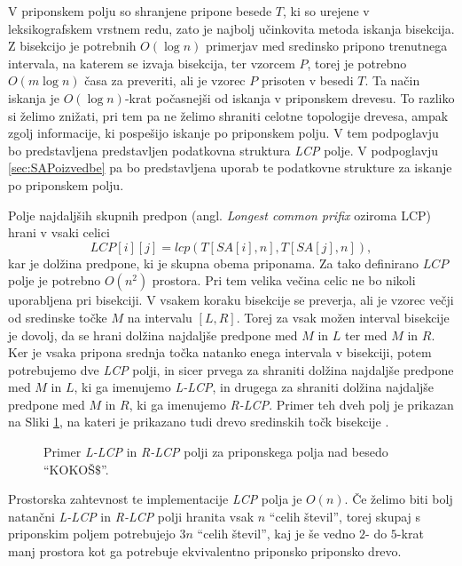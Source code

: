 V priponskem polju so shranjene pripone besede $T$, ki so urejene v leksikografskem vrstnem redu, zato je najbolj učinkovita metoda iskanja bisekcija. Z bisekcijo je potrebnih $O(\log{n})$ primerjav med sredinsko pripono trenutnega intervala, na katerem se izvaja bisekcija, ter vzorcem $P$, torej je potrebno $O(m\log{n})$ časa za preveriti, ali je vzorec $P$ prisoten v besedi $T$. Ta način iskanja je $O(\log{n})$-krat počasnejši od iskanja v priponskem drevesu. To razliko si želimo znižati, pri tem pa ne želimo shraniti celotne topologije drevesa, ampak zgolj informacije, ki pospešijo iskanje po priponskem polju. V tem podpoglavju bo predstavljena predstavljen podatkovna struktura \textit{LCP} polje. V podpoglavju \ref{sec:SAPoizvedbe} pa bo predstavljena uporab te podatkovne strukture za iskanje po priponskem polju.

Polje najdaljših skupnih predpon (angl. \textit{Longest common prifix} oziroma LCP) hrani v vsaki celici 
    $$\textit{LCP}[i][j]=lcp(T[SA[i],n],T[SA[j],n]),$$
kar je dolžina predpone, ki je skupna obema priponama. Za tako definirano $LCP$ polje je potrebno $O(n^2)$ prostora. Pri tem velika večina celic ne bo nikoli uporabljena pri bisekciji. V vsakem koraku bisekcije se preverja, ali je vzorec večji od sredinske točke $M$ na intervalu $[L,R]$. Torej za vsak možen interval bisekcije je dovolj, da se hrani dolžina najdaljše predpone med $M$ in $L$ ter med $M$ in $R$. Ker je vsaka pripona srednja točka natanko enega intervala v bisekciji, potem potrebujemo dve \textit{LCP} polji, in sicer prvega za shraniti dolžina najdaljše predpone med $M$ in $L$, ki ga imenujemo \textit{L-LCP}, in drugega za shraniti dolžina najdaljše predpone med $M$ in $R$, ki ga imenujemo \textit{R-LCP}. Primer teh dveh polj je prikazan na Sliki \ref{fig:RlcpLlcpSuffuxArray}, na kateri je prikazano tudi drevo sredinskih točk bisekcije \cite{Manber1990}. 

\begin{figure}[htb] 
    
    \centering
    \caption{Primer \textit{L-LCP} in \textit{R-LCP} polji za priponskega polja nad besedo \enquote{KOKOŠ$\$$}.} 
    \label{fig:RlcpLlcpSuffuxArray}
\end{figure}

Prostorska zahtevnost te implementacije \textit{LCP} polja je $O(n)$. Če želimo biti bolj natančni \textit{L-LCP} in \textit{R-LCP} polji hranita vsak $n$ \enquote{celih števil}, torej skupaj s priponskim poljem potrebujejo $3n$ \enquote{celih števil}, kaj je še vedno $2$- do $5$-krat manj prostora kot ga potrebuje ekvivalentno priponsko priponsko drevo.
